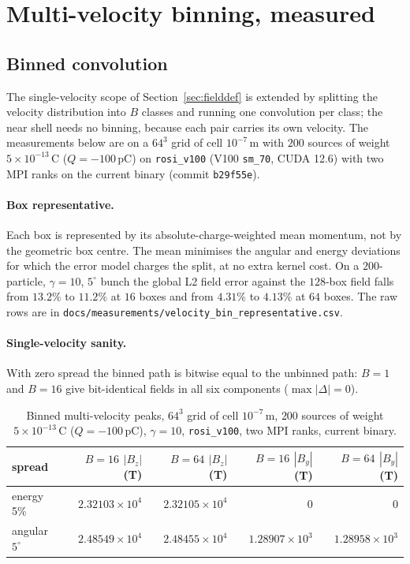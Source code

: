 \section{Multi-velocity binning, measured}
\label{app:multivel}

\subsection{Binned convolution}
\label{sec:multivel}

The single-velocity scope of Section~\ref{sec:fielddef} is extended by
splitting the velocity distribution into $B$ classes and running one
convolution per class; the near shell needs no binning, because each pair
carries its own velocity. The measurements below are on a $64^3$ grid of cell
$10^{-7}$\,m with $200$ sources of weight $5\times10^{-13}$\,C
($Q=-100$\,pC) on \texttt{rosi\_v100} (V100 \texttt{sm\_70}, CUDA 12.6) with two MPI ranks on the current binary (commit \texttt{b29f55e}).

\paragraph{Box representative.}
Each box is represented by its absolute-charge-weighted mean momentum, not by
the geometric box centre.  The mean minimises the angular and energy
deviations for which the error model charges the split, at no extra kernel
cost.  On a $200$-particle, $\gamma=10$, $5^\circ$ bunch the global L2 field
error against the $128$-box field falls from $13.2\%$ to $11.2\%$ at
$16$ boxes and from $4.31\%$ to $4.13\%$ at $64$ boxes.  The raw rows are in
\texttt{docs/measurements/velocity\_bin\_representative.csv}.

\paragraph{Single-velocity sanity.}
With zero spread the binned path is bitwise equal to the unbinned path:
$B=1$ and $B=16$ give bit-identical fields in all six components
($\max|\Delta|=0$).

\begin{table}[t]
\centering
\small
\caption{Binned multi-velocity peaks, $64^3$ grid of cell $10^{-7}$\,m,
$200$ sources of weight $5\times10^{-13}$\,C ($Q=-100$\,pC), $\gamma=10$,
\texttt{rosi\_v100}, two MPI ranks, current binary.}
\label{tab:multivel}
\begin{tabular}{lrrrr}
\toprule
spread & $B\!=\!16$ $|B_z|$ (T) & $B\!=\!64$ $|B_z|$ (T) & $B\!=\!16$ $|B_y|$ (T) & $B\!=\!64$ $|B_y|$ (T) \\
\midrule
energy 5\%      & $2.32103\times10^{4}$ & $2.32105\times10^{4}$ & $0$ & $0$ \\
angular $5^\circ$ & $2.48549\times10^{4}$ & $2.48455\times10^{4}$ & $1.28907\times10^{3}$ & $1.28958\times10^{3}$ \\
\bottomrule
\end{tabular}
\end{table}

